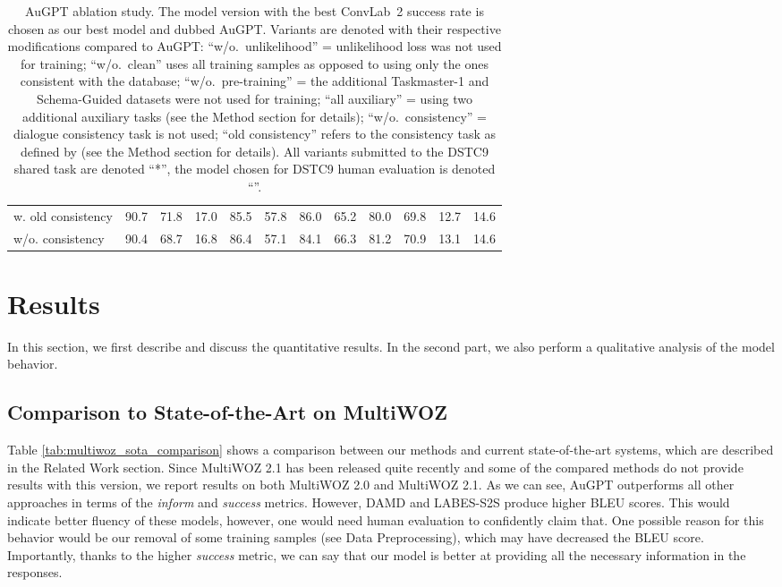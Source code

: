 \documentclass[letterpaper]{article} %
\newcommand{\multiwoz}[0]{MultiWOZ 2.0 }
\newcommand{\multiwozn}[0]{MultiWOZ 2.1 }
\begin{document}
\begin{table}[ht]
\begin{tabular}{l|ccc|ccc|ccc|cc}
    w. old consistency & 90.7 & 71.8 & 17.0 & 85.5 & 57.8 & 86.0 & 65.2 & 80.0 & 69.8 & 12.7 & 14.6  \\
    w/o. consistency & 90.4 & 68.7 & 16.8 &  86.4 & 57.1 & 84.1 & 66.3 & 81.2 & 70.9 & 13.1 & 14.6 \\
    \bottomrule
  \end{tabular}
  \caption{AuGPT ablation study. The model version with the best ConvLab~2 success rate is chosen as our best model and dubbed AuGPT. Variants are denoted with their respective modifications compared to AuGPT: ``w/o.\ unlikelihood'' = unlikelihood loss was not used for training; ``w/o.\ clean'' uses all training samples as opposed to using only the ones consistent with the database; ``w/o.\ pre-training'' = the additional Taskmaster-1 and Schema-Guided datasets were not used for training; ``all auxiliary'' = using two additional auxiliary tasks (see the Method section for details); ``w/o.\ consistency'' = dialogue consistency task is not used; ``old consistency'' refers to the consistency task as defined by \citet{peng2020} (see the Method section for details). All variants submitted to the DSTC9 shared task are denoted “*”, the model chosen for DSTC9 human evaluation is denoted “\textdagger”.}
  \label{tab:ablation_comparison}
\end{table}

\section{Results}
In this section, we first describe and discuss the quantitative results.
In the second part, we also perform a qualitative analysis of the model behavior.

\subsection{Comparison to State-of-the-Art on MultiWOZ}
Table \ref{tab:multiwoz_sota_comparison} shows a comparison between our methods and current state-of-the-art systems, which are described in the Related Work section.
Since \multiwozn has been released quite recently and some of the compared methods do not provide results with this version, we report results on both \multiwoz and MultiWOZ 2.1.
As we can see, AuGPT outperforms all other approaches in terms of the \emph{inform} and \emph{success} metrics. However, DAMD and LABES-S2S produce higher BLEU scores.
This would indicate better fluency of these models, however, one would need human evaluation to confidently claim that.
One possible reason for this behavior would be our removal of some training samples (see Data Preprocessing), which may have decreased the BLEU score.
Importantly, thanks to the higher \emph{success} metric, we can say that our model is better at providing all the necessary information in the responses.
\end{document}
